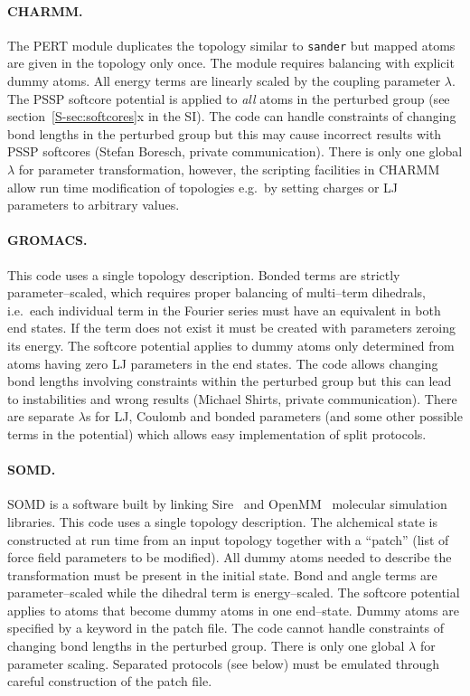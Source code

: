 \documentclass[journal=jctcce,manuscript=article]{achemso}
\newcommand{\progname}[1]{\texttt{#1}}
\begin{document}
\paragraph{CHARMM.} The PERT module duplicates the topology similar to
\progname{sander} but mapped atoms are given in the topology only once.
The module requires balancing with explicit dummy atoms.  All energy terms are
linearly scaled by the coupling parameter $\lambda$.  The PSSP softcore potential is applied to \emph{all}
atoms in the perturbed group (see section~\ref{S-sec:softcores}x in the SI).
The code can handle constraints of changing bond lengths in the perturbed group but this may cause incorrect results with PSSP softcores (Stefan Boresch, private communication).  There is only one global $\lambda$ for parameter
transformation, however, the scripting facilities in CHARMM allow run time
modification of topologies e.g.\ by setting charges or LJ parameters
to arbitrary values.

\paragraph{GROMACS.} This code uses a single topology description.
Bonded terms are strictly parameter--scaled, which requires proper
balancing of multi--term dihedrals, i.e.\ each individual term in the Fourier
series must have an equivalent in both end states.  If the term does not exist
it must be created with parameters zeroing its energy.
The softcore potential applies to dummy
atoms only determined from atoms having zero LJ parameters in the end states.
The code allows changing bond lengths involving constraints within the perturbed group  but this can lead to instabilities and wrong results (Michael Shirts, private communication).  There are separate $\lambda$s for LJ,
Coulomb and bonded parameters (and some other possible terms in the potential) which allows easy implementation
of split protocols.

\paragraph{SOMD.} SOMD is a software built by linking  Sire~\cite{Sire-2016}
and OpenMM~\cite{doi:10.1021/ct300857j} molecular simulation libraries.
This code uses a single topology description.
The alchemical state is constructed at run time from an input topology together with
a ``patch'' (list of force field parameters to be modified).  All dummy atoms
needed to describe the transformation must be present in the initial state.
Bond and angle terms are parameter--scaled while the dihedral term is
energy--scaled.  The softcore potential applies to atoms that become dummy atoms
in one end--state.  Dummy atoms are specified by a keyword in the patch file.
The code cannot handle constraints of changing bond lengths in the
perturbed group.  There is only one global $\lambda$ for parameter
scaling.  Separated protocols (see below) must be emulated through
careful construction of the patch file.
\end{document}
